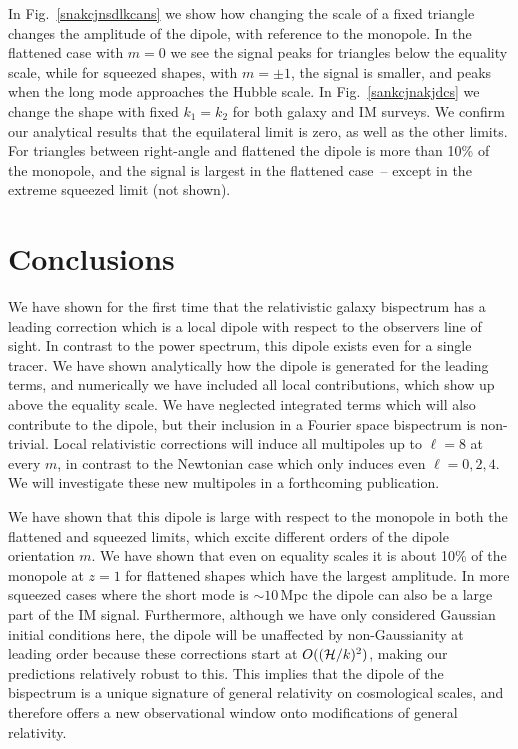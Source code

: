 In Fig.~\eqref{snakcjnsdlkcans} we show how changing the scale of a fixed triangle changes the amplitude of the dipole, with reference to the monopole. In the flattened case with $m=0$ we see the signal peaks for triangles below the equality scale, while for squeezed shapes, with $m=\pm1$, the signal is smaller, and peaks when the long mode approaches the Hubble scale. 
In Fig.~\eqref{sankcjnakjdcs} we change the shape with fixed $k_1=k_2$ for both galaxy and IM surveys. We confirm our analytical results that the equilateral limit is zero, as well as the other limits. For triangles between right-angle and flattened the dipole is more than 10\% of the monopole, and the signal is largest in the flattened case~-- except in the extreme squeezed limit (not shown). 


\section{Conclusions}

We have shown for the first time that the relativistic galaxy bispectrum has a leading correction which is a local dipole with respect to the observers line of sight. In contrast to the power spectrum, this dipole exists even for a single tracer. We have shown analytically how the dipole is generated for the leading terms, and numerically we have included all local contributions, which show up above the equality scale. We have neglected integrated terms which will also contribute to the dipole, but their inclusion in a Fourier space bispectrum is non-trivial. Local relativistic corrections will induce all multipoles up to $\ell=8$ at every $m$, in contrast to the Newtonian case which only induces even $\ell=0,2,4$. We will investigate these new multipoles in a forthcoming publication. 

We have shown that this dipole is large with respect to the monopole in both the flattened and squeezed limits, which excite different orders of the dipole orientation $m$.  We have shown that even on equality scales it is about 10\% of the monopole at $z=1$ for flattened shapes which have the largest amplitude. In more squeezed cases where the short mode is $\sim10$\,Mpc the dipole can also be a large part of the IM signal. Furthermore, although we have only considered Gaussian initial conditions here, the dipole will be unaffected by non-Gaussianity at leading order because these corrections start at $O((\mathcal{H}/k)^2)$, making our predictions relatively robust to this. This implies that the dipole of the bispectrum is a unique signature of general relativity on cosmological scales, and therefore offers a new observational window onto modifications of general relativity. 




